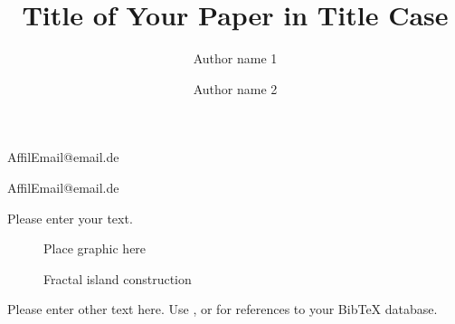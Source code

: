 \documentclass[a4paper,11pt]{article}
\begin{document}
\title{Title of Your Paper in Title Case}
\author{Author name 1}{Affil}{Email@email.de}
\author{Author name 2}{Affil}{Email@email.de}
\maketitle


Please enter your text.
\begin{figure}
Place graphic here
\caption{Fractal island construction}
\label{fig:fractal_island_construction}
\end{figure}

Please enter other text here. Use \parencite{key}, \cite{key} or \textcite{key} for references to your BibTeX database.

\printbibliography
\end{document}
